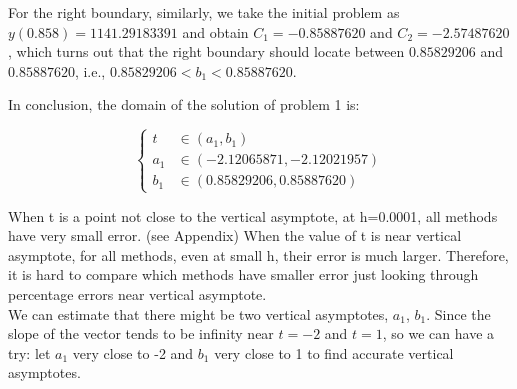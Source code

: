 \documentclass[a4paper]{article}
\begin{document}
	For the right boundary, similarly, we take the initial problem as $y(0.858) = 1141.29183391$ and obtain $C_1 = -0.85887620$ and $C_2 = -2.57487620$, which turns out that the right boundary should locate between $0.85829206$ and $0.85887620$, i.e., $0.85829206 < b_1 < 0.85887620$. 
	
	In conclusion, the domain of the solution of problem 1 is:
	
	$$
	\left\{
	\begin{aligned}
		t &\in (a_1, b_1) \nonumber \\
		a_1 &\in (-2.12065871, -2.12021957) \nonumber \\
		b_1 &\in (0.85829206, 0.85887620) \nonumber
	\end{aligned}
	\right.
	$$
	
	
	When t is a point not close to the vertical asymptote, at h=0.0001, all methods have very small error. (see Appendix) When the value of t is near vertical asymptote, for all methods, even at small h, their error is much larger. Therefore, it is hard to compare which methods have smaller error just looking through percentage errors near vertical asymptote. \\
	
	We can estimate that there might be two vertical asymptotes, $a_1$, $b_1$. Since the slope of the vector tends to be infinity near $t=-2$ and $t=1$, so we can have a try: let $a_1$ very close to -2 and $b_1$ very close to 1 to find accurate vertical asymptotes.
	
\end{document}
